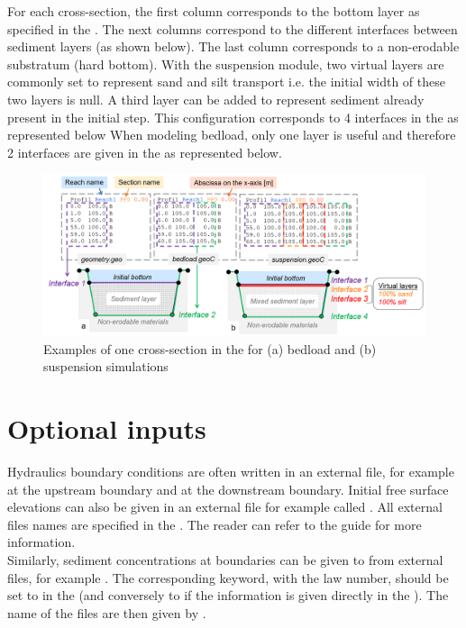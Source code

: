 For each cross-section, the first column corresponds to the bottom layer as specified in the . The next columns correspond to the different interfaces between sediment layers (as shown below). The last column corresponds to a non-erodable substratum (hard bottom). 
With the suspension module, two virtual layers are commonly set to represent sand and silt transport i.e. the initial width of these two layers is null. A third layer can be added to represent sediment already present in the initial step. This configuration corresponds to 4 interfaces in the  as represented below
When modeling bedload, only one layer is useful and therefore 2 interfaces are given in the  as represented below. 

\begin{figure}[htb!]
    \centering
    \includegraphics[width=\textwidth]{./graphics/geo_files.png}
    \caption{Examples of one cross-section in the  for (a) bedload and (b) suspension simulations}
    \label{fig:geo_files}
\end{figure}

\section{Optional inputs}
\label{optional_inputs}

Hydraulics boundary conditions are often written in an external file, for example  at the upstream boundary and  at the downstream boundary. Initial free surface elevations can also be given in an external file for example called . All external files names are specified in the \xcas. The reader can refer to the \mascaret guide for more information.\\

Similarly, sediment concentrations at boundaries can be given to \courlis from external files, for example . The corresponding  keyword, with  the law number, should be set to  in the \cas (and conversely to  if the information is given directly in the \cas). The name of the files are then given by .\\

